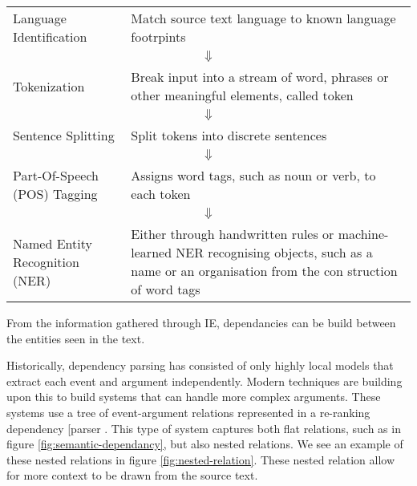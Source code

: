 \documentclass[bsc,frontabs,twoside,singlespacing,parskip,deptreport]{infthesis}     %
\begin{document}
\begin{tcolorbox}[width=\textwidth,
                  interior hidden,
                  boxsep=10pt,
                  left=0pt,
                  right=0pt,
                  top=2pt]

 \begin{tabularx}{\linewidth}{lX}

 Language Identification &  Match source text language to known language footrpints\vspace{1em}\\
  \multicolumn{2}{c}{$\Downarrow$} \\
 Tokenization &  Break input into a stream of word, phrases or other meaningful elements, called token\vspace{1em}\\

  \multicolumn{2}{c}{$\Downarrow$} \\
 Sentence Splitting &  Split tokens into discrete sentences\vspace{1em}\\

  \multicolumn{2}{c}{$\Downarrow$} \\
 Part-Of-Speech (POS) Tagging &   Assigns word tags, such as noun or verb, to each token\vspace{1em} \\

  \multicolumn{2}{c}{$\Downarrow$} \\
 Named Entity Recognition (NER) &   Either through handwritten rules or machine-learned NER recognising objects, such as a name or an
    organisation from the con struction of word tags

 \end{tabularx}
\end{tcolorbox}
From the information gathered through IE, dependancies can be build between the entities seen in the text.


Historically, dependency parsing has consisted of only highly local models that extract each event and argument independently.
Modern techniques are building upon this to build systems that can handle more complex arguments. These systems use a tree of
event-argument relations represented in a re-ranking dependency [parser \cite{mcclosky2011event}.
This type of system captures both flat relations, such as in figure \ref{fig:semantic-dependancy}, but also nested relations.
We see an example of these nested relations in figure \ref{fig:nested-relation}. These nested relation allow for more context to be drawn from
the source text.
\end{document}
